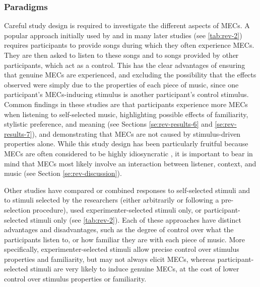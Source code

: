 

\subsubsection{Paradigms}

Careful study design is required to investigate the different aspects of MECs. A popular approach initially used by \textcite{blood2001} and in many later studies (see \autoref{tab:rev-2}) requires participants to provide songs during which they often experience MECs. They are then asked to listen to these songs and to songs provided by other participants, which act as a control. This has the clear advantages of ensuring that genuine MECs are experienced, and excluding the possibility that the effects observed were simply due to the properties of each piece of music, since one participant’s MECs-inducing stimulus is another participant’s control stimulus. Common findings in these studies are that participants experience more MECs when listening to self-selected music, highlighting possible effects of familiarity, stylistic preference, and meaning (see Sections \ref{se:rev-results-6} and \ref{se:rev-results-7}), and demonstrating that MECs are not caused by stimulus-driven properties alone. While this study design has been particularly fruitful because MECs are often considered to be highly idiosyncratic \parencite{nusbaum2014, panksepp1995}, it is important to bear in mind that MECs most likely involve an interaction between listener, context, and music (see Section \ref{se:rev-discussion}).

Other studies have compared or combined responses to self-selected stimuli and to stimuli selected by the researchers (either arbitrarily or following a pre-selection procedure), used experimenter-selected stimuli only, or participant-selected stimuli only (see \autoref{tab:rev-2}). Each of these approaches have distinct advantages and disadvantages, such as the degree of control over what the participants listen to, or how familiar they are with each piece of music. More specifically, experimenter-selected stimuli allow precise control over stimulus properties and familiarity, but may not always elicit MECs, whereas participant-selected stimuli are very likely to induce genuine MECs, at the cost of lower control over stimulus properties or familiarity.

